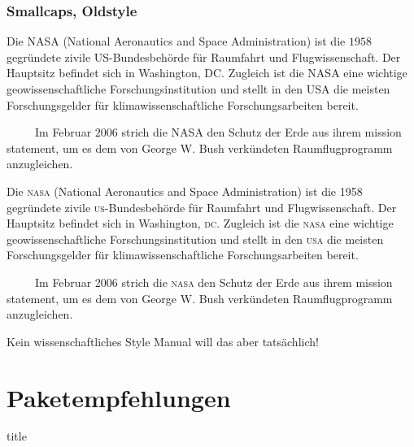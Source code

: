 \documentclass[handout]{beamer}
\makeatletter
\newcommand\sectiontitlepage{
    \miniframesoff
    \begin{frame}
        \vfill
        \centering
        \begin{beamercolorbox}[sep=8pt,center,shadow=true,rounded=true]{title}
            \usebeamerfont{title}\insertsectionhead\par%
        \end{beamercolorbox}
        \vfill
    \end{frame}
    \miniframeson
}
\let\beamer@writeslidentry@miniframeson=\beamer@writeslidentry
\def\beamer@writeslidentry@miniframesoff{%
    \expandafter\beamer@ifempty\expandafter{\beamer@framestartpage}{}%
    {%
        \clearpage\beamer@notesactions%
    }
}
\newcommand*{\miniframeson}{\let\beamer@writeslidentry=\beamer@writeslidentry@miniframeson}
\newcommand*{\miniframesoff}{\let\beamer@writeslidentry=\beamer@writeslidentry@miniframesoff}
\makeatother
\begin{document}
\begin{frame}[fragile]
    \frametitle{Smallcaps, Oldstyle}%
    \vspace*{-2.5ex}
    \begin{multicols}{2}
        \small\justifying
        Die NASA (National Aeronautics and Space Administration) ist die $1958$ gegründete zivile US-Bundesbehörde für Raumfahrt und Flugwissenschaft.
        Der Hauptsitz befindet sich in Washington, DC.
        Zugleich ist die NASA eine wichtige geowissenschaftliche Forschungsinstitution und stellt in den USA die meisten Forschungsgelder für klimawissenschaftliche Forschungsarbeiten bereit.

        ~~~~~Im Februar $2006$ strich die NASA den Schutz der Erde aus ihrem mission statement, um es dem von George W. Bush verkündeten Raumflugprogramm anzugleichen.

        Die \textsc{nasa} (National Aeronautics and Space Administration) ist die 1958 gegründete zivile \textsc{us}-Bundesbehörde für Raumfahrt und Flugwissenschaft.
        Der Hauptsitz befindet sich in Washington, \textsc{dc}.
        Zugleich ist die \textsc{nasa} eine wichtige geowissenschaftliche Forschungsinstitution und stellt in den \textsc{usa} die meisten Forschungsgelder für klimawissenschaftliche Forschungsarbeiten bereit.

        ~~~~~Im Februar 2006 strich die \textsc{nasa} den Schutz der Erde aus ihrem mission statement, um es dem von George W. Bush verkündeten Raumflugprogramm anzugleichen.
    \end{multicols}
    \pause
    Kein wissenschaftliches Style Manual will das aber tatsächlich!
\end{frame}

\section{Paketempfehlungen}

\sectiontitlepage
\end{document}
